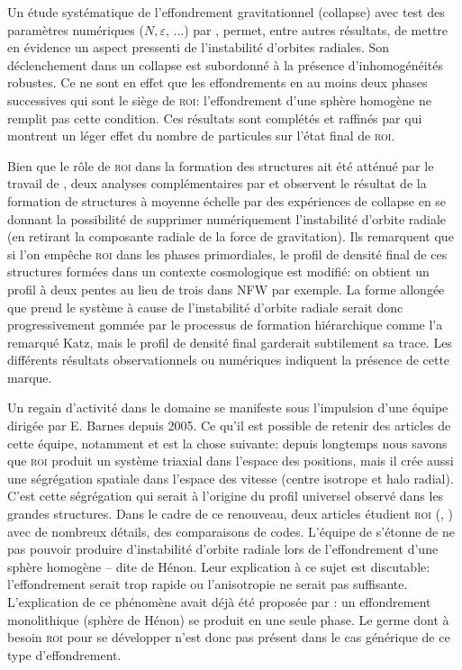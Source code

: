 Un étude systématique de l'effondrement gravitationnel (collapse) avec test des paramètres numériques ($N,\varepsilon$, ...) par
\cite{roy}, permet, entre autres résultats, de mettre en évidence un aspect pressenti de l'instabilité d'orbites radiales. Son déclenchement dans un
collapse est subordonné à la présence d'inhomogénéités robustes. Ce ne sont en effet que les effondrements en au moins deux phases successives qui sont le
siège de \textsc{roi}: l'effondrement d'une sphère homogène ne remplit pas cette condition. Ces résultats sont complétés et raffinés par
\cite{boily} qui montrent un léger effet du nombre de particules sur l'état final de \textsc{roi}.

Bien que le rôle de \textsc{roi} dans la formation des structures ait été atténué par le travail de \cite{katz}, deux analyses
complémentaires par \cite{huss} et \cite{macmillan} observent le résultat de la formation de structures à moyenne
échelle par des expériences de collapse en se donnant la possibilité de supprimer numériquement l'instabilité d'orbite radiale (en retirant la
composante radiale de la force de gravitation). Ils remarquent que si l'on empêche \textsc{roi} dans les phases primordiales, le profil
de densité final de ces structures formées dans un contexte cosmologique est modifié: on obtient un profil à deux pentes au lieu de trois dans NFW par exemple.
La forme allongée que prend le système à cause de l'instabilité d'orbite radiale serait donc progressivement gommée par le processus de formation
hiérarchique comme l'a remarqué Katz, mais le profil de densité final garderait subtilement sa trace. Les différents résultats observationnels ou
numériques indiquent la présence de cette marque.

Un regain d'activité dans le domaine se manifeste sous l'impulsion d'une équipe dirigée par E. Barnes depuis 2005. Ce qu'il est possible de retenir des
articles de cette équipe, notamment \cite{barnes2005} et \cite{ROI_Moderne} est la chose suivante: depuis longtemps nous savons que \textsc{roi} produit
un système triaxial dans l'espace des positions, mais il crée aussi une ségrégation spatiale dans l'espace des vitesse (centre isotrope et halo
radial). C'est cette ségrégation qui serait à l'origine du profil universel observé dans les grandes structures. Dans le cadre de ce
renouveau, deux articles étudient \textsc{roi} (\cite{barneslanzel}, \cite{trenti}) avec de nombreux détails, des
comparaisons de codes. L'équipe de \cite{trenti} s'étonne de ne pas pouvoir produire d'instabilité d'orbite radiale lors de
l'effondrement d'une sphère homogène -- dite de Hénon. Leur explication à ce sujet est discutable: l'effondrement serait trop rapide ou l'anisotropie
ne serait pas suffisante. L'explication de ce phénomène avait déjà été proposée par \cite{roy}: un effondrement monolithique
(sphère de Hénon) se produit en une seule phase. Le germe dont à besoin \textsc{roi} pour se développer n'est donc pas présent dans le cas générique
de ce type d'effondrement.

